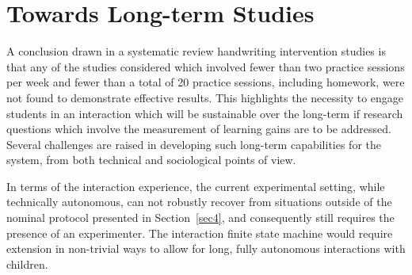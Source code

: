 \documentclass{sig-alternate}
\begin{document}




\section{Towards Long-term Studies}\label{sec:futureWork}

A conclusion drawn in a systematic review handwriting intervention studies \cite{Hoy2011} 
is that any of the studies considered which involved 
fewer than two practice sessions per week and fewer than a total of 20 practice 
sessions, including homework, were not found to demonstrate effective results. This 
highlights the necessity to engage students in an interaction which will be sustainable
 over the long-term if 
research questions which involve the measurement of learning gains are to be addressed. 
Several challenges are raised in developing such long-term capabilities for the system,
 from both technical and sociological points of view. %

In terms of the interaction experience, the current experimental setting, while
technically autonomous, can not robustly recover from situations outside of the
nominal protocol presented in Section~\ref{sec4}, and consequently still
requires the presence of an experimenter. The interaction finite state machine would
require extension in non-trivial ways to allow for long, fully autonomous
interactions with children.
\end{document}
